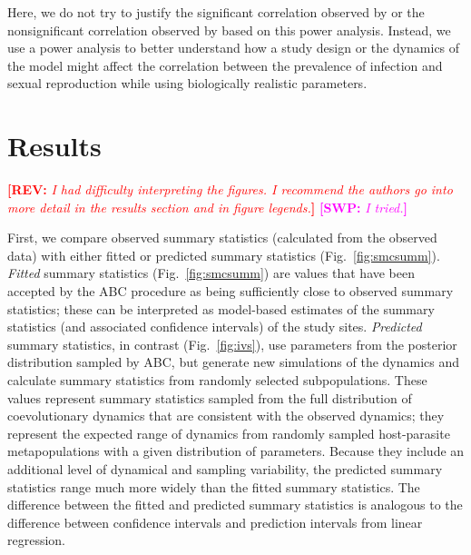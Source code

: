 \documentclass{article}\usepackage[]{graphicx}\usepackage[]{color}
\newcommand{\comment}[3]{\textcolor{#1}{\textbf{[#2: }\textit{#3}\textbf{]}}}
\newcommand{\swp}[1]{\comment{magenta}{SWP}{#1}}
\newcommand{\rev}[1]{\comment{red}{REV}{#1}}
\newcommand{\fref}[1]{Fig.~\ref{fig:#1}}
\begin{document}
Here, we do not try to justify the significant correlation observed by \citep{mckone2016fine} or the nonsignificant correlation observed by \citep{dagan2013clonal} based on this power analysis. 
Instead, we use a power analysis to better understand how a study design or the dynamics of the model might affect the correlation between the prevalence of infection and sexual reproduction while using biologically realistic parameters.

\section{Results}

\rev{I had difficulty interpreting the figures. I recommend the authors go into more detail in the results section and in figure legends.}
\swp{I tried.}

First, we compare observed summary statistics (calculated from the observed data) with either fitted or predicted summary statistics (\fref{smcsumm}).
\emph{Fitted} summary statistics (\fref{smcsumm}) are values that have been accepted by the ABC procedure as being sufficiently close to observed summary statistics;
these can be interpreted as model-based estimates of the summary statistics (and associated confidence intervals) of the study sites.
\emph{Predicted} summary statistics, in contrast (\fref{ivs}), use parameters from the posterior distribution sampled by ABC, but generate new simulations of the dynamics and calculate summary statistics from randomly selected subpopulations.
These values represent summary statistics sampled from the full distribution of coevolutionary dynamics that are consistent with the observed dynamics; they represent the expected range of dynamics from randomly sampled host-parasite metapopulations with a given distribution of parameters.
Because they include an additional level of dynamical and sampling variability, the predicted summary statistics range much more widely than the fitted summary statistics.
The difference between the fitted and predicted summary statistics is analogous to 
the difference between confidence intervals and prediction intervals from 
linear regression.
\end{document}
